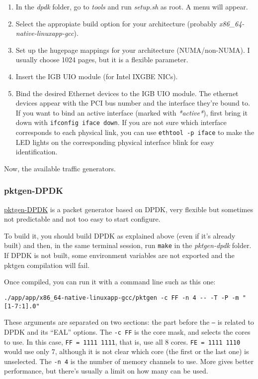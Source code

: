 \documentclass[oneside]{hpman}
\begin{document}
\begin{enumerate}[itemsep=0pt]
\item In the \textit{dpdk} folder, go to \textit{tools} and run \textit{setup.sh} as root. A menu will appear.
\item Select the appropiate build option for your architecture (probably \textit{x86\_64-native-linuxapp-gcc}).
\item Set up the hugepage mappings for your architecture (NUMA/non-NUMA). I usually choose 1024 pages, but it is a flexible parameter.
\item Insert the IGB UIO module (for Intel IXGBE NICs).
\item Bind the desired Ethernet devices to the IGB UIO module. The ethernet devices appear with the PCI bus number and the interface they're bound to. If you want to bind an active interface (marked with \textit{*active*}), first bring it down with \texttt{ifconfig iface down}. If you are not sure which interface corresponds to each physical link, you can use \texttt{ethtool -p iface} to make the LED lights on the corresponding physical interface blink for easy identification.
\end{enumerate}

Now, the available traffic generators.

\subsubsection{pktgen-DPDK}

 \href{http://dpdk.org/download}{pktgen-DPDK} is a packet generator based on DPDK, very flexible but sometimes not predictable and not too easy to start configure.

To build it, you should build DPDK as explained above (even if it's already built) and then, in the same terminal session, run \texttt{make} in the \textit{pktgen-dpdk} folder. If DPDK is not built, some environment variables are not exported and the pktgen compilation will fail.

Once compiled, you can run it with a command line such as this one:
\begin{verbatim}
./app/app/x86_64-native-linuxapp-gcc/pktgen -c FF -n 4 -- -T -P -m "[1-7:1].0"
\end{verbatim}

These arguments are separated on two sections: the part before the \texttt{--} is related to DPDK and its ``EAL'' options. The \texttt{-c FF} is the core mask, and selects the cores to use. In this case, \texttt{FF = 1111 1111}, that is, use all 8 cores. \texttt{FE = 1111 1110} would use only 7, although it is not clear which core (the first or the last one) is unselected. The \texttt{-n 4} is the number of memory channels to use. More gives better performance, but there's usually a limit on how many can be used.
\end{document}
